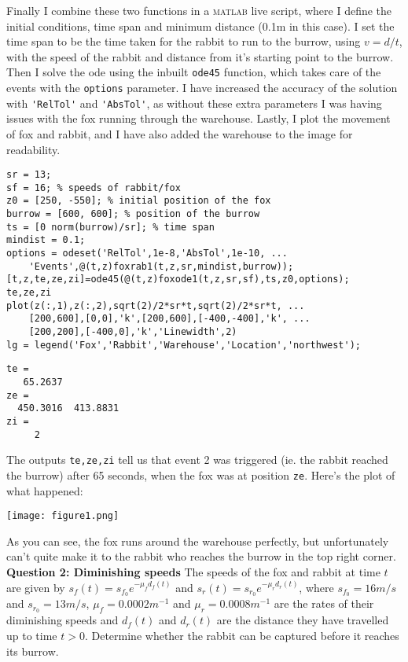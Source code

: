 \documentclass[a4paper,12pt]{article}
\begin{document}
Finally I combine these two functions in a \textsc{matlab} live script, where I define the initial conditions, time span and minimum distance (0.1m in this case). I set the time span to be the time taken for the rabbit to run to the burrow, using $v=d/t$, with the speed of the rabbit and distance from it's starting point to the burrow. Then I solve the ode using the inbuilt \verb!ode45! function, which takes care of the events with the \verb!options! parameter. I have increased the accuracy of the solution with \verb!'RelTol'! and \verb!'AbsTol'!, as without these extra parameters I was having issues with the fox running through the warehouse. Lastly, I plot the movement of fox and rabbit, and I have also added the warehouse to the image for readability.

\begin{lstlisting}
sr = 13;
sf = 16; % speeds of rabbit/fox
z0 = [250, -550]; % initial position of the fox
burrow = [600, 600]; % position of the burrow
ts = [0 norm(burrow)/sr]; % time span
mindist = 0.1;
options = odeset('RelTol',1e-8,'AbsTol',1e-10, ...
    'Events',@(t,z)foxrab1(t,z,sr,mindist,burrow));
[t,z,te,ze,zi]=ode45(@(t,z)foxode1(t,z,sr,sf),ts,z0,options);
te,ze,zi
plot(z(:,1),z(:,2),sqrt(2)/2*sr*t,sqrt(2)/2*sr*t, ...
    [200,600],[0,0],'k',[200,600],[-400,-400],'k', ...
    [200,200],[-400,0],'k','Linewidth',2)
lg = legend('Fox','Rabbit','Warehouse','Location','northwest');
\end{lstlisting}

\begin{lstlisting}
te =
   65.2637
ze =
  450.3016  413.8831
zi =
     2
\end{lstlisting}

The outputs \verb!te,ze,zi! tell us that event 2 was triggered (ie. the rabbit reached the burrow) after 65 seconds, when the fox was at position \verb!ze!. Here's the plot of what happened:

\texttt{[image: figure1.png]}

As you can see, the fox runs around the warehouse perfectly, but unfortunately can't quite make it to the rabbit who reaches the burrow in the top right corner.\\

\noindent\textbf{Question 2: Diminishing speeds} \hspace{0.25cm} The speeds of the fox and rabbit at time $t$ are given by $s_{f}(t)=s_{f_0}e^{-\mu_{f}d_{f}(t)}$ and $s_{r}(t)=s_{r_0}e^{-\mu_{r}d_{r}(t)}$, where $s_{f_0}=16m/s$ and $s_{r_0}=13m/s$, $\mu_f=0.0002m^{-1}$ and $\mu_r=0.0008m^{-1}$ are the rates of their diminishing speeds and $d_f(t)$ and $d_r(t)$ are the distance they have travelled up to time $t > 0$. Determine whether the rabbit can be captured before it reaches its burrow.
\end{document}
